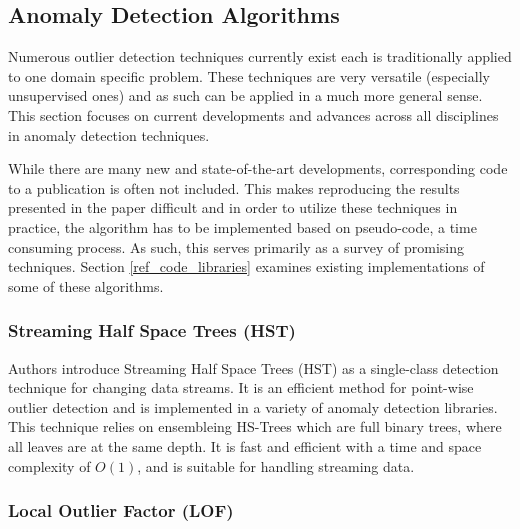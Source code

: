 \subsection{Anomaly Detection Algorithms}
\label{ref_anomaly_detection_alg}

Numerous outlier detection techniques currently exist each is traditionally applied to one domain specific problem. These techniques are very versatile (especially unsupervised ones) and as such can be applied in a much more general sense. This section focuses on current developments and advances across all disciplines in anomaly detection techniques.

While there are many new and state-of-the-art developments, corresponding code to a publication is often not included. This makes reproducing the results presented in the paper difficult and in order to utilize these techniques in practice, the algorithm has to be implemented based on pseudo-code, a time consuming process. As such, this serves primarily as a survey of promising techniques. Section \ref{ref_code_libraries} examines existing implementations of some of these algorithms.

\subsubsection{Streaming Half Space Trees (HST)}
Authors \cite{fast-anomaly-detection-streaming} introduce Streaming Half Space Trees (HST) as a single-class detection technique for changing data streams. It is an efficient method for point-wise outlier detection and is implemented in a variety of anomaly detection libraries. This technique relies on ensembleing HS-Trees which are full binary trees, where all leaves are at the same depth. It is fast and efficient with a time and space complexity of $O(1)$, and is suitable for handling streaming data.



\subsubsection{Local Outlier Factor (LOF)}

